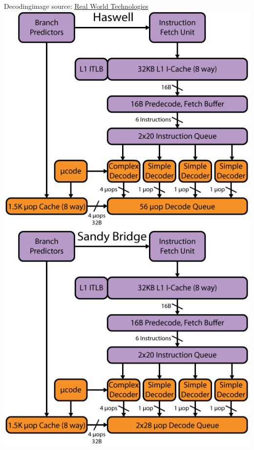 \documentclass[mathserif,xcolor={dvipsnames,table}]{beamer}
\begin{document}
\begin{frame}{Decoding\hfill\tiny{image source: \href{http://realworldtech.com}{Real World Technologies}}}
\includegraphics[scale=.49]{images/haswell-1.png}
\end{frame}
\end{document}
